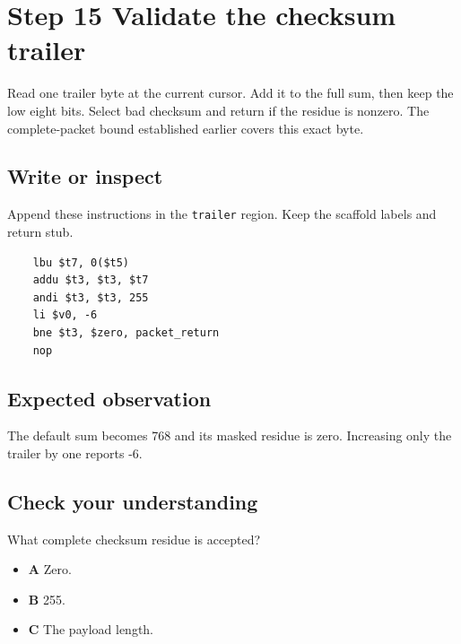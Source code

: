 \section{Step 15 Validate the checksum trailer}\label{packet-s15}

Read one trailer byte at the current cursor. Add it to the full sum, then keep the low eight bits. Select bad checksum and return if the residue is nonzero. The complete-packet bound established earlier covers this exact byte.

\subsection{Write or inspect}
Append these instructions in the \texttt{trailer} region. Keep the scaffold labels and return stub.

\begin{verbatim}
    lbu $t7, 0($t5)
    addu $t3, $t3, $t7
    andi $t3, $t3, 255
    li $v0, -6
    bne $t3, $zero, packet_return
    nop
\end{verbatim}

\subsection{Expected observation}
The default sum becomes 768 and its masked residue is zero. Increasing only the trailer by one reports -6.

\subsection{Check your understanding}
What complete checksum residue is accepted?

\begin{itemize}
  \item \textbf{A} Zero.
  \item \textbf{B} 255.
  \item \textbf{C} The payload length.
\end{itemize}
